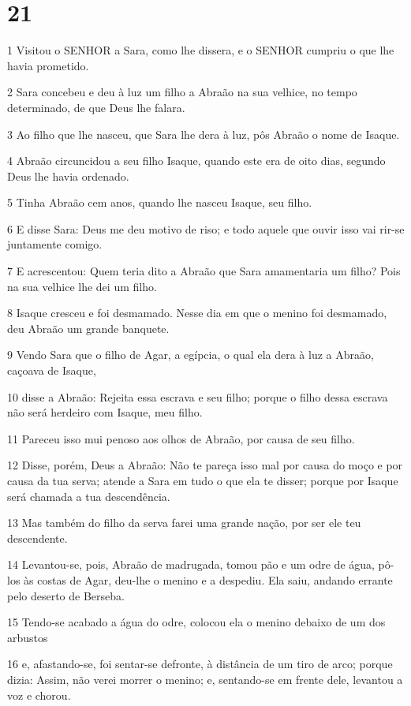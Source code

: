 \chapter{21}

\par 1 Visitou o SENHOR a Sara, como lhe dissera, e o SENHOR cumpriu o que lhe havia prometido.
\par 2 Sara concebeu e deu à luz um filho a Abraão na sua velhice, no tempo determinado, de que Deus lhe falara.
\par 3 Ao filho que lhe nasceu, que Sara lhe dera à luz, pôs Abraão o nome de Isaque.
\par 4 Abraão circuncidou a seu filho Isaque, quando este era de oito dias, segundo Deus lhe havia ordenado.
\par 5 Tinha Abraão cem anos, quando lhe nasceu Isaque, seu filho.
\par 6 E disse Sara: Deus me deu motivo de riso; e todo aquele que ouvir isso vai rir-se juntamente comigo.
\par 7 E acrescentou: Quem teria dito a Abraão que Sara amamentaria um filho? Pois na sua velhice lhe dei um filho.
\par 8 Isaque cresceu e foi desmamado. Nesse dia em que o menino foi desmamado, deu Abraão um grande banquete.
\par 9 Vendo Sara que o filho de Agar, a egípcia, o qual ela dera à luz a Abraão, caçoava de Isaque,
\par 10 disse a Abraão: Rejeita essa escrava e seu filho; porque o filho dessa escrava não será herdeiro com Isaque, meu filho.
\par 11 Pareceu isso mui penoso aos olhos de Abraão, por causa de seu filho.
\par 12 Disse, porém, Deus a Abraão: Não te pareça isso mal por causa do moço e por causa da tua serva; atende a Sara em tudo o que ela te disser; porque por Isaque será chamada a tua descendência.
\par 13 Mas também do filho da serva farei uma grande nação, por ser ele teu descendente.
\par 14 Levantou-se, pois, Abraão de madrugada, tomou pão e um odre de água, pô-los às costas de Agar, deu-lhe o menino e a despediu. Ela saiu, andando errante pelo deserto de Berseba.
\par 15 Tendo-se acabado a água do odre, colocou ela o menino debaixo de um dos arbustos
\par 16 e, afastando-se, foi sentar-se defronte, à distância de um tiro de arco; porque dizia: Assim, não verei morrer o menino; e, sentando-se em frente dele, levantou a voz e chorou.

